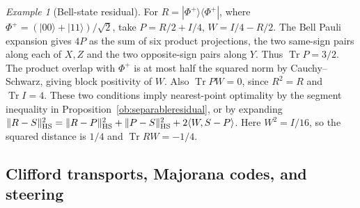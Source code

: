 \documentclass[aps,pra,onecolumn,superscriptaddress,nofootinbib,10pt]{revtex4-2}
\theoremstyle{definition}
\theoremstyle{remark}
\newtheorem{example}[theorem]{Example}
\newcommand{\tr}{\operatorname{Tr}}
\begin{document}
\begin{example}[Bell-state residual]\label{ob:bellresidual}
For \(R=|\Phi^+\rangle\langle\Phi^+|\), where
\(\Phi^+=(|00\rangle+|11\rangle)/\sqrt2\), take
\(P=R/2+I/4\), \(W=I/4-R/2\).
The Bell Pauli expansion gives \(4P\) as the sum of six product
projections, the two same-sign pairs along each of \(X,Z\) and
the two opposite-sign pairs along \(Y\). Thus \(\tr P=3/2\).
The product overlap with \(\Phi^+\) is at most half the squared norm
by Cauchy--Schwarz, giving block positivity of \(W\).
Also \(\tr PW=0\), since \(R^2=R\) and \(\tr I=4\). These two
conditions imply nearest-point optimality by the segment inequality
in Proposition~\ref{ob:separableresidual}, or by expanding
\(\|R-S\|_{\rm HS}^2=\|R-P\|_{\rm HS}^2+\|P-S\|_{\rm HS}^2
+2\langle W,S-P\rangle\).
Here \(W^2=I/16\), so the squared distance is \(1/4\) and
\(\tr RW=-1/4\).
\end{example}

\subsection{Clifford transports, Majorana codes, and steering}
\label{ob:magic}
\end{document}
